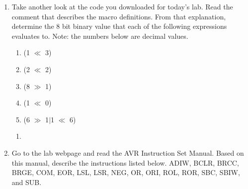 \documentclass[12pt,letterpaper]{article}
\begin{document}
\begin{enumerate}
	\item Take another look at the code you downloaded for today’s lab. Read the comment that describes the macro definitions. From that explanation, determine the 8 bit binary value that each of the following expressions evaluates to. Note: the numbers below are decimal values.

\begin{enumerate}
\item (1 $\ll$ 3)
\item (2 $\ll$ 2)
\item (8 $\gg$ 1)
\item (1 $\ll$ 0)
\item (6 $\gg$ 1$\mid$1 $\ll$ 6)
\end{enumerate}

	\begin{enumerate}
	\item 
	\end{enumerate}
	
	\item Go to the lab webpage and read the AVR Instruction Set Manual. Based
on this manual, describe the instructions listed below. ADIW, BCLR, BRCC, BRGE, COM, EOR, LSL, LSR, NEG, OR, ORI, ROL, ROR, SBC, SBIW, and SUB.


\end{enumerate}
\end{document}
